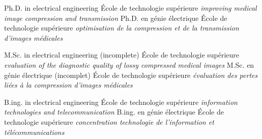 \documentclass[print]{friggeri-cv}
\begin{document}
\begin{entrylist}
  \engfr
  { {Ph.D. in electrical engineering} {École de technologie supérieure} {\emph{improving medical image compression and transmission}}}
  { {Ph.D. en génie électrique} {École de technologie supérieure} {\emph{optimisation de la compression et de la transmission d'images médicales}}}

  \engfr
  { {M.Sc. in electrical engineering (incomplete\textsuperscript{\tiny\textdaggerdbl})} {École de technologie supérieure} {\emph{evaluation of the diagnostic quality of lossy compressed medical images}}}
  { {M.Sc. en génie électrique (incomplet\textsuperscript{\tiny\textdaggerdbl})} {École de technologie supérieure} {\emph{évaluation des pertes liées à la compression d'images médicales}}}

  \engfr
  { {B.ing. in electrical engineering} {École de technologie supérieure} {\emph{information technologies and telecommunication}}}
  { {B.ing. en génie électrique} {École de technologie supérieure} {\emph{concentration technologie de l'information et télécommunications}}}

\end{entrylist}



\end{document}

